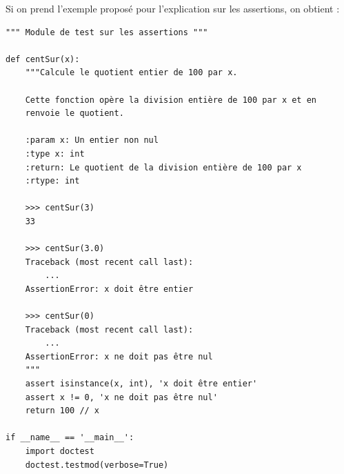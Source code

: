 Si on prend l'exemple proposé pour l'explication sur les assertions, on obtient :

\begin{verbatim}
""" Module de test sur les assertions """

def centSur(x):
    """Calcule le quotient entier de 100 par x.
    
    Cette fonction opère la division entière de 100 par x et en
    renvoie le quotient.    
    
    :param x: Un entier non nul
    :type x: int
    :return: Le quotient de la division entière de 100 par x
    :rtype: int
    
    >>> centSur(3)
    33
    
    >>> centSur(3.0)
    Traceback (most recent call last):
        ...
    AssertionError: x doit être entier
    
    >>> centSur(0)
    Traceback (most recent call last):
        ...
    AssertionError: x ne doit pas être nul
    """
    assert isinstance(x, int), 'x doit être entier'
    assert x != 0, 'x ne doit pas être nul'
    return 100 // x

if __name__ == '__main__':
    import doctest
    doctest.testmod(verbose=True)
\end{verbatim}